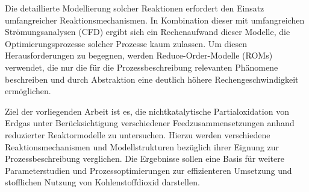     Die detaillierte Modellierung solcher Reaktionen erfordert den Einsatz umfangreicher Reaktionsmechanismen. In Kombination dieser mit umfangreichen Strömungsanalysen (CFD) ergibt sich ein Rechenaufwand dieser Modelle, die Optimierungsprozesse solcher Prozesse kaum zulassen. Um diesen Herausforderungen zu begegnen, werden Reduce-Order-Modelle (ROMs) verwendet, die nur die für die Prozessbeschreibung relevanten Phänomene beschreiben und durch Abstraktion eine deutlich höhere Rechengeschwindigkeit ermöglichen. 

    Ziel der vorliegenden Arbeit ist es, die nichtkatalytische Partialoxidation von Erdgas unter Berücksichtigung verschiedener Feedzusammensetzungen anhand reduzierter Reaktormodelle zu untersuchen. Hierzu werden verschiedene Reaktionsmechanismen und Modellstrukturen bezüglich ihrer Eignung zur Prozessbeschreibung verglichen. Die Ergebnisse sollen eine Basis für weitere Parameterstudien und Prozess\-optimierungen zur effizienteren Umsetzung und stofflichen Nutzung von Kohlenstoffdioxid darstellen.
